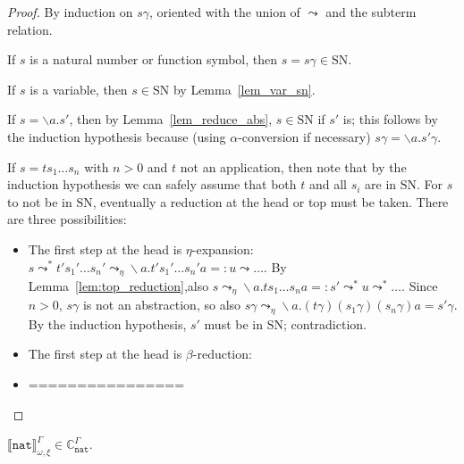 \documentclass[runningheads,a4paper]{llncs}
\newcommand{\arreta}{\leadsto_\eta}
\newcommand{\arrnormalise}{\leadsto}
\newcommand{\abstraction}[2]{\backslash #1.#2}
\newcommand{\nat}{\mathtt{nat}}
\newcommand{\SN}{\mathrm{SN}}
\newcommand{\Cb}{\mathbb{C}}
\newcommand{\val}[3]{\ensuremath{\llbracket#1\rrbracket_{#2}^{#3}}}
\begin{document}
\begin{proof}
By induction on $s\gamma$, oriented with the union of $\arrnormalise$
and the subterm relation.

If $s$ is a natural number or function symbol, then $s = s\gamma \in
\SN$.

If $s$ is a variable, then $s \in \SN$ by Lemma~\ref{lem_var_sn}.

If $s = \abstraction{a}{s'}$, then by Lemma~\ref{lem_reduce_abs}, $s
\in \SN$ if $s'$ is; this follows by the induction hypothesis because
(using $\alpha$-conversion if necessary) $s\gamma = \abstraction{a}{
s'\gamma}$.

If $s = t s_1 \ldots s_n$ with $n > 0$ and $t$ not an application,
then note that by the induction hypothesis we can safely assume that
both $t$ and all $s_i$ are in $\SN$.  For $s$ to not be in $\SN$,
eventually a reduction at the head or top must be taken.  There are
three possibilities:
\begin{itemize}
\item The first step at the head is $\eta$-expansion:
  $s \arrnormalise^* t' s_1' \ldots s_n' \arreta \abstraction{a}{t'
  s_1' \ldots s_n' a} =: u \arrnormalise \dots$.
  By Lemma~\ref{lem:top_reduction},also $s \arreta \abstraction{a}{
  t s_1 \ldots s_n a} =: s' \arrnormalise^* u \arrnormalise^* \dots$.
  Since $n > 0$, $s\gamma$ is not an abstraction, so also
  $s\gamma \arreta \abstraction{a}{(t\gamma) (s_1\gamma) (s_n\gamma) a}
  = s'\gamma$.  By the induction hypothesis, $s'$ must be in $\SN$;
  contradiction.
\item The first step at the head is $\beta$-reduction:
\item ================
\end{itemize}
\end{proof}

\begin{lemma}\label{lem_nat_reducible}
  $\val{\nat}{\omega,\xi}{\Gamma} \in \Cb_{\nat}^\Gamma$.
\end{lemma}
\end{document}
